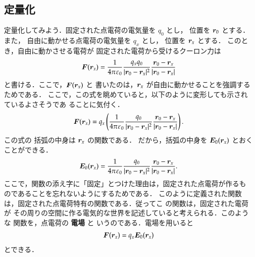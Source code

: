     \subsection{定量化}
                定量化してみよう．固定された点電荷の電気量を $q_{0}$ とし，
                位置を $\boldsymbol{r}_{0}$ とする．また，
                自由に動かせる点電荷の電気量を $q_{x}$ とし，
                位置を $\boldsymbol{r}_{x}$ とする．
                このとき，自由に動かさせる電荷が 固定された電荷から受けるクーロン力は
                        \begin{align}
                            \boldsymbol{F}(\boldsymbol{r}_{x})=\frac{1}{4\pi\varepsilon_{0}}
                            \frac{q_{x}q_{0}}{|\boldsymbol{r}_{0}-\boldsymbol{r}_{x}|^{2}}
                            \frac{\boldsymbol{r}_{0}-\boldsymbol{r}_{x}}
                                 {|\boldsymbol{r}_{0}-\boldsymbol{r}_{x}|}
                        \end{align}
                と書ける．ここで，$\boldsymbol{F}(\boldsymbol{r}_{x})$ と
                書いたのは，$\boldsymbol{r}_{x}$ が自由に動かせることを強調するためである．
                ここで，この式を眺めていると，以下のように変形しても示されているよさそうであ
                ることに気付く．
                        \begin{align}
                            \boldsymbol{F}(\boldsymbol{r}_{x})=q_{x}\left(\frac{1}{4\pi\varepsilon_{0}}
                            \frac{q_{0}}{|\boldsymbol{r}_{0}-\boldsymbol{r}_{x}|^{2}}
                            \frac{\boldsymbol{r}_{0}-\boldsymbol{r}_{x}}
                                 {|\boldsymbol{r}_{0}-\boldsymbol{r}_{x}|}\right).
                        \end{align}
                この式の 括弧の中身は $\boldsymbol{r}_{x}$ の関数である．
                だから，括弧の中身を $\boldsymbol{E}_{0}(\boldsymbol{r}_{x})$ とおくことができる．
                        \begin{align}
                            \boldsymbol{E}_{0}(\boldsymbol{r}_{x})=\frac{1}{4\pi\varepsilon_{0}}
                            \frac{q_{0}}{|\boldsymbol{r}_{0}-\boldsymbol{r}_{x}|^{2}}
                            \frac{\boldsymbol{r}_{0}-\boldsymbol{r}_{x}}
                                 {|\boldsymbol{r}_{0}-\boldsymbol{r}_{x}|}.
                        \end{align}
                ここで，関数の添え字に「固定」とつけた理由は，固定された点電荷が作るも
                のであることを忘れないようにするためである．
                このように定義された関数は，固定された点電荷特有の関数である．従ってこ
                の関数は，固定された電荷が
                その周りの空間に作る電気的な世界を記述していると考えられる．このような
                関数を，点電荷の \textbf{電場} と
                いうのである．電場を用いると
                        \begin{align}
                            \boldsymbol{F}(\boldsymbol{r}_{x})
                            =q_{x}\boldsymbol{E}_{0}(\boldsymbol{r}_{x})
                        \end{align}
                とできる．

